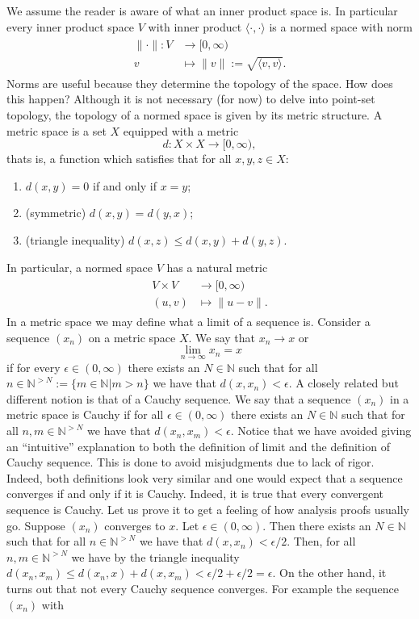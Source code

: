 \documentclass{article}
\begin{document}
We assume the reader is aware of what an inner product space is. In particular every inner product space $V$ with inner product $\langle\cdot,\cdot\rangle$ is a normed space with norm
\begin{align}
\begin{split}
\|\cdot\|:V&\rightarrow [0,\infty) \\
v&\mapsto\|v\|:=\sqrt{\langle v,v\rangle}.
\end{split}
\end{align}
Norms are useful because they determine the topology of the space. How does this happen? Although it is not necessary (for now) to delve into point-set topology, the topology of a normed space is given by its metric structure. A metric space is a set $X$ equipped with a metric
\begin{equation}
d:X\times X\rightarrow [0,\infty),
\end{equation}
thats is, a function which satisfies that for all $x,y,z\in X$:
\begin{enumerate}
\item $d(x,y)=0$ if and only if $x=y$;
\item (symmetric) $d(x,y)=d(y,x)$;
\item (triangle inequality) $d(x,z)\leq d(x,y)+d(y,z)$.
\end{enumerate}
In particular, a normed space $V$ has a natural metric
\begin{align}
\begin{split}
V\times V &\rightarrow [0,\infty)\\
(u,v)&\mapsto \|u-v\|.
\end{split}
\end{align}
In a metric space we may define what a limit of a sequence is. Consider a sequence $(x_n)$ on a metric space $X$. We say that $x_n\rightarrow x$ or
\begin{equation}
\lim_{n\rightarrow\infty}x_n=x
\end{equation}
if for every $\epsilon\in (0,\infty)$ there exists an $N\in\mathbb{N}$ such that for all $n\in\mathbb{N}^{>N}:=\{m\in\mathbb{N}|m>n\}$ we have that $d(x,x_n)<\epsilon$. A closely related but different notion is that of a Cauchy sequence. We say that a sequence $(x_n)$ in a metric space is Cauchy if for all $\epsilon\in (0,\infty)$ there exists an $N\in\mathbb{N}$ such that for all $n,m\in\mathbb{N}^{>N}$ we have that $d(x_n,x_m)<\epsilon$. Notice that we have avoided giving an ``intuitive'' explanation to both the definition of limit and the definition of Cauchy sequence. This is done to avoid misjudgments due to lack of rigor. Indeed, both definitions look very similar and one would expect that a sequence converges if and only if it is Cauchy. Indeed, it is true that every convergent sequence is Cauchy. Let us prove it to get a feeling of how analysis proofs usually go. Suppose $(x_n)$ converges to $x$. Let $\epsilon\in (0,\infty)$. Then there exists an $N\in\mathbb{N}$ such that for all $n\in\mathbb{N}^{>N}$ we have that $d(x,x_n)<\epsilon/2$. Then, for all $n,m\in\mathbb{N}^{>N}$ we have by the triangle inequality $d(x_n,x_m)\leq d(x_n,x)+d(x,x_m)<\epsilon/2+\epsilon/2=\epsilon$. On the other hand, it turns out that not every Cauchy sequence converges. For example the sequence $(x_n)$ with
\end{document}
